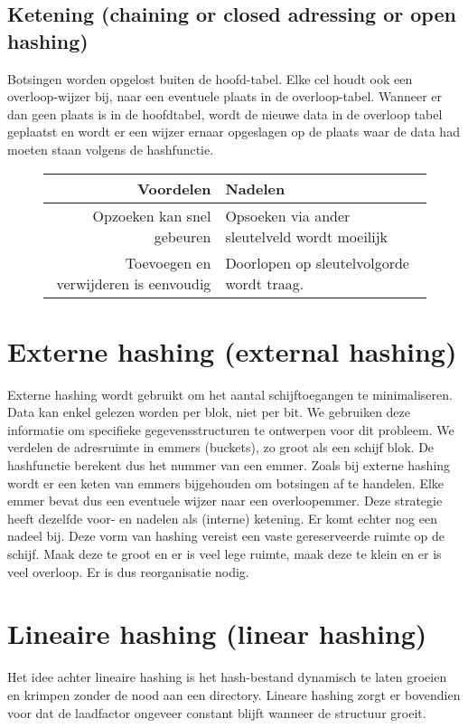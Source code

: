 \documentclass[hashing.tex]{subfiles}
\begin{document}
\subsection{Ketening (chaining or closed adressing or open hashing)}
Botsingen worden opgelost buiten de hoofd-tabel. Elke cel houdt ook een overloop-wijzer bij, naar een eventuele plaats in de overloop-tabel. Wanneer er dan geen plaats is in de hoofdtabel, wordt de nieuwe data in de overloop tabel geplaatst en wordt er een wijzer ernaar opgeslagen op de plaats waar de data had moeten staan volgens de hashfunctie.
\begin{figure}[H]
\centering
\begin{tabular}{r|l}
Voordelen & Nadelen\\
\hline
Opzoeken kan snel gebeuren & Opsoeken via ander sleutelveld wordt moeilijk\\
Toevoegen en verwijderen is eenvoudig & Doorlopen op sleutelvolgorde wordt traag.
\end{tabular}
\end{figure}

\section{Externe hashing (external hashing)}
Externe hashing wordt gebruikt om het aantal schijftoegangen te minimaliseren. Data kan enkel gelezen worden per blok, niet per bit. We gebruiken deze informatie om specifieke gegevensstructuren te ontwerpen voor dit probleem.
We verdelen de adresruimte in emmers (buckets), zo groot als een schijf blok. De hashfunctie berekent dus het nummer van een emmer.
Zoals bij externe hashing wordt er een keten van emmers bijgehouden om botsingen af te handelen. Elke emmer bevat dus een eventuele wijzer naar een overloopemmer.
Deze strategie heeft dezelfde voor- en nadelen als (interne) ketening. Er komt echter nog een nadeel bij. Deze vorm van hashing vereist een vaste gereserveerde ruimte op de schijf. Maak deze te groot en er is veel lege ruimte, maak deze te klein en er is veel overloop. Er is dus reorganisatie nodig.

\section{Lineaire hashing (linear hashing)}
Het idee achter lineaire hashing is het hash-bestand dynamisch te laten groeien en krimpen zonder de nood aan een directory. Lineare hashing zorgt er bovendien voor dat de laadfactor ongeveer constant blijft wanneer de structuur groeit.
\end{document}
